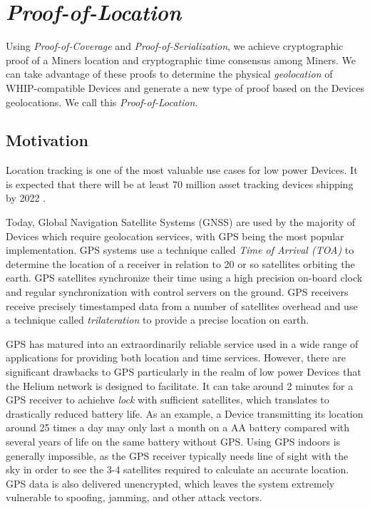 \documentclass[10pt, nonatbib, nocopyrightspace, reprint]{sigplanconf}
\begin{document}
\section{\emph{Proof-of-Location}} \label{geolocation}

Using \emph{Proof-of-Coverage} and \emph{Proof-of-Serialization}, we achieve cryptographic proof of a Miners location and cryptographic time consensus among Miners. We can take advantage of these proofs to determine the physical \emph{geolocation} of WHIP-compatible Devices and generate a new type of proof based on the Devices geolocations. We call this \emph{Proof-of-Location}.

\subsection{Motivation}

Location tracking is one of the most valuable use cases for low power Devices. It is expected that there will be at least 70 million asset tracking devices shipping by 2022 \cite{mobile-experts}.

Today, Global Navigation Satellite Systems (GNSS) are used by the majority of Devices which require geolocation services, with GPS being the most popular implementation. GPS systems use a technique called \emph{Time of Arrival (TOA)} to determine the location of a receiver in relation to 20 or so satellites orbiting the earth. GPS satellites synchronize their time using a high precision on-board clock and regular synchronization with control servers on the ground. GPS receivers receive precisely timestamped data from a number of satellites overhead and use a technique called \emph{trilateration} to provide a precise location on earth.

GPS has matured into an extraordinarily reliable service used in a wide range of applications for providing both location and time services. However, there are significant drawbacks to GPS particularly in the realm of low power Devices that the Helium network is designed to facilitate. It can take around 2 minutes for a GPS receiver to achiehve \emph{lock} with sufficient satellites, which translates to drastically reduced battery life. As an example, a Device transmitting its location around 25 times a day may only last a month on a AA battery compared with several years of life on the same battery without GPS. Using GPS indoors is generally impossible, as the GPS receiver typically needs line of sight with the sky in order to see the 3-4 satellites required to calculate an accurate location. GPS data is also delivered unencrypted, which leaves the system extremely vulnerable to spoofing, jamming, and other attack vectors.
\end{document}
